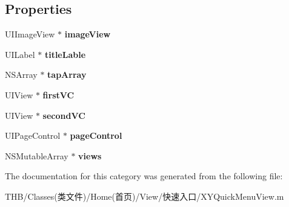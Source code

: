 \subsection*{Properties}
\begin{DoxyCompactItemize}
\item 
\mbox{\label{category_x_y_quick_menu_view_07_08_a747fd8e00565cb22e5344f2102ae32df}} 
U\+I\+Image\+View $\ast$ {\bfseries image\+View}
\item 
\mbox{\label{category_x_y_quick_menu_view_07_08_a923c2c265883eb88a38df2bd4297de1d}} 
U\+I\+Label $\ast$ {\bfseries title\+Lable}
\item 
\mbox{\label{category_x_y_quick_menu_view_07_08_afb3a95c3c067228fc41a823c7c4f39fb}} 
N\+S\+Array $\ast$ {\bfseries tap\+Array}
\item 
\mbox{\label{category_x_y_quick_menu_view_07_08_aa01fe01a1fe686e056847d5a084bc7a6}} 
U\+I\+View $\ast$ {\bfseries first\+VC}
\item 
\mbox{\label{category_x_y_quick_menu_view_07_08_adc1c4c0b85d1799036195dc2cdb6ca2c}} 
U\+I\+View $\ast$ {\bfseries second\+VC}
\item 
\mbox{\label{category_x_y_quick_menu_view_07_08_aad22611a255a7401d617eb18a64e0153}} 
U\+I\+Page\+Control $\ast$ {\bfseries page\+Control}
\item 
\mbox{\label{category_x_y_quick_menu_view_07_08_a917ff9f340fee59339d1dd5ecba59a2f}} 
N\+S\+Mutable\+Array $\ast$ {\bfseries views}
\end{DoxyCompactItemize}


The documentation for this category was generated from the following file\+:\begin{DoxyCompactItemize}
\item 
T\+H\+B/\+Classes(类文件)/\+Home(首页)/\+View/快速入口/X\+Y\+Quick\+Menu\+View.\+m\end{DoxyCompactItemize}
